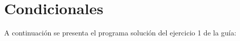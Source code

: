 \section{Condicionales}

  A continuación se presenta el programa solución
  del ejercicio 1 de la guía:
  
  
    
  \pagebreak[4]